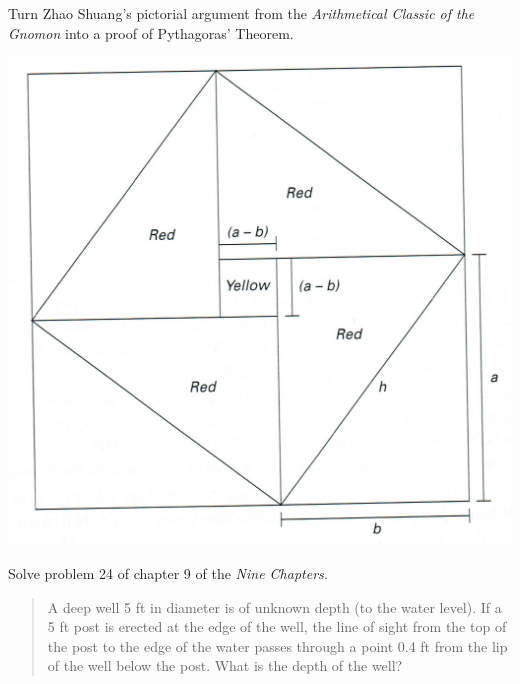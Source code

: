 \begin{exercisessec}{}{}
\begin{enumerate}
  
  \begin{minipage}[t]{0.53\linewidth}\vspace{0pt}
  \item\label{exs:gaoguproof}%
  Turn Zhao Shuang's pictorial argument from the \emph{Arithmetical Classic of the Gnomon} into a proof of Pythagoras' Theorem.
 \end{minipage}\hfill\begin{minipage}[t]{0.46\linewidth}\vspace{0pt}
  \flushright\includegraphics[scale=0.25,angle=-1]{ZhaoPythag}
  \end{minipage}


	
	\item Solve problem 24 of chapter 9 of  the \emph{Nine Chapters.}
	\begin{quote}
		A deep well 5 ft in diameter is of unknown depth (to the water level). If a 5 ft post is erected at the edge of the well, the line of sight from the top of the post to the edge of the water passes through a point 0.4 ft from the lip of the well below the post. What is the depth of the well?
	\end{quote}
  

\end{enumerate}
\end{exercisessec}
